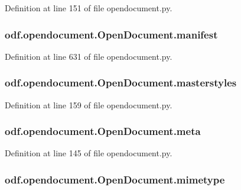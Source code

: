Definition at line 151 of file opendocument.\+py.

\hypertarget{classodf_1_1opendocument_1_1OpenDocument_a9711036b13566a608fe7e29d9e7c6dd8}{
\subsubsection[{manifest}]{\setlength{\rightskip}{0pt plus 5cm}odf.\+opendocument.\+Open\+Document.\+manifest}}\label{classodf_1_1opendocument_1_1OpenDocument_a9711036b13566a608fe7e29d9e7c6dd8}


Definition at line 631 of file opendocument.\+py.

\hypertarget{classodf_1_1opendocument_1_1OpenDocument_a86acdec5e5d8fcb48e2ab5c8bfc98559}{
\subsubsection[{masterstyles}]{\setlength{\rightskip}{0pt plus 5cm}odf.\+opendocument.\+Open\+Document.\+masterstyles}}\label{classodf_1_1opendocument_1_1OpenDocument_a86acdec5e5d8fcb48e2ab5c8bfc98559}


Definition at line 159 of file opendocument.\+py.

\hypertarget{classodf_1_1opendocument_1_1OpenDocument_a6dd5a93c11c28823e1c2abf73a019769}{
\subsubsection[{meta}]{\setlength{\rightskip}{0pt plus 5cm}odf.\+opendocument.\+Open\+Document.\+meta}}\label{classodf_1_1opendocument_1_1OpenDocument_a6dd5a93c11c28823e1c2abf73a019769}


Definition at line 145 of file opendocument.\+py.

\hypertarget{classodf_1_1opendocument_1_1OpenDocument_a7aa1e6e714802e1062e8cedc8389accd}{
\subsubsection[{mimetype}]{\setlength{\rightskip}{0pt plus 5cm}odf.\+opendocument.\+Open\+Document.\+mimetype}}\label{classodf_1_1opendocument_1_1OpenDocument_a7aa1e6e714802e1062e8cedc8389accd}


